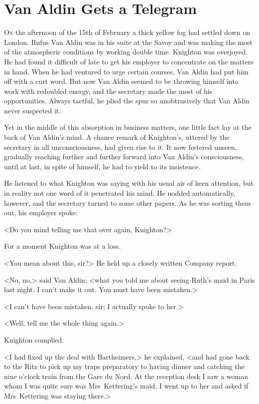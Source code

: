 \chapter{Van Aldin Gets a Telegram}



\lettrine{O}{n} the afternoon of the 15th of February a thick yellow fog had settled down on London. Rufus Van Aldin was in his suite at the Savoy and was making the most of the atmospheric conditions by working double time. Knighton was overjoyed. He had found it difficult of late to get his employer to concentrate on the matters in hand. When he had ventured to urge certain courses, Van Aldin had put him off with a curt word. But now Van Aldin seemed to be throwing himself into work with redoubled energy, and the secretary made the most of his opportunities. Always tactful, he plied the spur so unobtrusively that Van Aldin never suspected it.

Yet in the middle of this absorption in business matters, one little fact lay at the back of Van Aldin's mind. A chance remark of Knighton's, uttered by the secretary in all unconsciousness, had given rise to it. It now festered unseen, gradually reaching further and further forward into Van Aldin's consciousness, until at last, in spite of himself, he had to yield to its insistence.

He listened to what Knighton was saying with his usual air of keen attention, but in reality not one word of it penetrated his mind. He nodded automatically, however, and the secretary turned to some other papers. As he was sorting them out, his employer spoke:

<Do you mind telling me that over again, Knighton?>

For a moment Knighton was at a loss.

<You mean about this, sir?> He held up a closely written Company report.

<No, no,> said Van Aldin; <what you told me about seeing Ruth's maid in Paris last night. I can't make it out. You must have been mistaken.>

<I can't have been mistaken, sir; I actually spoke to her.>

<Well, tell me the whole thing again.>

Knighton complied.

<I had fixed up the deal with Bartheimers,> he explained, <and had gone back to the Ritz to pick up my traps preparatory to having dinner and catching the nine o'clock train from the Gare du Nord. At the reception desk I saw a woman whom I was quite sure was Mrs~Kettering's maid. I went up to her and asked if Mrs~Kettering was staying there.>

